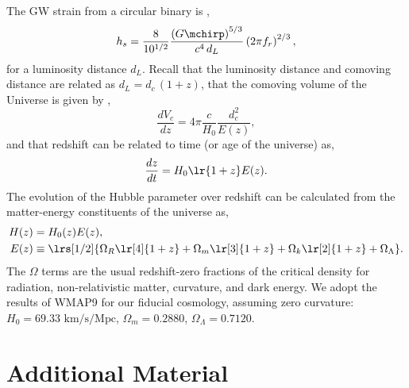     The GW strain from a circular binary is \citep[][Eq.~7; sky and polarization averaged]{Sesana+2008},
        \begin{equation}
        \label{eq:source_strain}
        h_s = \frac{8}{10^{1/2}} \frac{\left(G\mchirp\right)^{5/3}}{c^4 \, d_L}
            \left(2 \pi f_r \right)^{2/3},
        \end{equation}
    for a luminosity distance $d_L$.  Recall that the luminosity distance and comoving distance are related as $d_L = d_c \, (1+z)$, that the comoving volume of the Universe is given by \citep{Hogg-1999},
    \begin{equation}
        \frac{d V_c}{dz} = 4\pi \frac{c}{H_0} \frac{d_c^2}{E(z)},
    \end{equation}
    and that redshift can be related to time (or age of the universe) as,
    \begin{align}
        \frac{dz}{dt} = H_0 \lr{1+z} E(z).
    \end{align}
    The evolution of the Hubble parameter over redshift can be calculated from the matter-energy constituents of the universe as,
    \begin{align}
        H(z) & = H_0(z) E(z), \\
        E(z) & \equiv \lrs[1/2]{\Omega_R \lr[4]{1+z} + \Omega_m \lr[3]{1+z} + \Omega_k \lr[2]{1+z} + \Omega_\Lambda}.
    \end{align}
    The $\Omega$ terms are the usual redshift-zero fractions of the critical density for radiation, non-relativistic matter, curvature, and dark energy.  We adopt the results of WMAP9 \citep{Hinshaw+2013} for our fiducial cosmology, assuming zero curvature: $H_0 = 69.33 \textrm{ km/s/Mpc}$, $\Omega_m = 0.2880$, $\Omega_\Lambda = 0.7120$.


\section{Additional Material}
    \label{sec:app}

